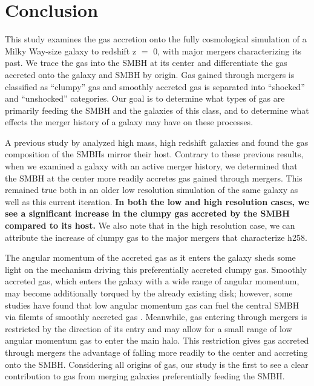 \documentclass[]{emulateapj}
\begin{document}



\section{Conclusion}
This study examines the gas accretion onto the fully cosmological simulation of a Milky Way-size galaxy to redshift z $=$ 0, with major mergers characterizing its past. We trace the gas into the SMBH at its center and differentiate the gas accreted onto the galaxy and SMBH by origin. Gas gained through mergers is classified as ``clumpy'' gas and smoothly accreted gas is separated into ``shocked'' and ``unshocked'' categories. Our goal is to determine what types of gas are primarily feeding the SMBH and the galaxies of this class, and to determine what effects the merger history of a galaxy may have on these processes.

A previous study by \cite{Bellovary2013} analyzed high mass, high redshift galaxies and found the gas composition of the SMBHs mirror their host. Contrary to these previous results, when we examined a galaxy with an active merger history, we determined that the SMBH at the center more readily accretes gas gained through mergers. This remained true both in an older low resolution simulation of the same galaxy as well as this current iteration. \textbf{In both the low and high resolution cases, we see a significant increase in the clumpy gas accreted by the SMBH compared to its host.} We also note that in the high resolution case, we can attribute the increase of clumpy gas to the major mergers that characterize h258. 

The angular momentum of the accreted gas as it enters the galaxy sheds some light on the mechanism driving this preferentially accreted clumpy gas. Smoothly accreted gas, which enters the galaxy with a wide range of angular momentum, may become additionally torqued by the already existing disk; however, some studies have found that low angular momentum gas can fuel the central SMBH via filemts of smoothly accreted gas \citep{Dubois2012,DiMatteo2016}. Meanwhile, gas entering through mergers is restricted by the direction of its entry and may allow for a small range of low angular momentum gas to enter the main halo. This restriction gives gas accreted through mergers the advantage of falling more readily to the center and accreting onto the SMBH. Considering all origins of gas, our study is the first to see a clear contribution to gas from merging galaxies preferentially feeding the SMBH.
\end{document}
